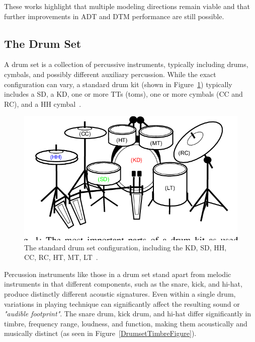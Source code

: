 These works highlight that multiple modeling directions remain viable and that further improvements in \gls{ADT} and \gls{DTM} performance are still possible.

\subsection{The Drum Set}

A drum set is a collection of percussive instruments, typically including drums, cymbals, and possibly different auxiliary percussion. While the exact configuration can vary, a standard drum kit (shown in Figure~\ref{DrumsetFigure}) typically includes a \gls{SD}, a \gls{KD}, one or more \glspl{TT} (toms), one or more cymbals (\gls{CC} and \gls{RC}), and a \gls{HH} cymbal~\cite{TheDrumHandbook2003}.

\begin{figure}[H]
    \centering
    \includegraphics[scale=0.7, trim={0 1cm 0 0},clip]{figures/drumset}
    \caption{The standard drum set configuration, including the \acrfull{KD}, \acrfull{SD}, \acrfull{HH}, \acrfull{CC}, \acrfull{RC}, \acrfull{HT}, \acrfull{MT}, \acrfull{LT}~\cite{8350302}.}
    \label{DrumsetFigure}
\end{figure}

Percussion instruments like those in a drum set stand apart from melodic instruments in that different components, such as the snare, kick, and hi-hat, produce distinctly different acoustic signatures. Even within a single drum, variations in playing technique can significantly affect the resulting sound or \textit{"audible footprint"}. The snare drum, kick drum, and hi-hat differ significantly in timbre, frequency range, loudness, and function, making them acoustically and musically distinct (as seen in Figure~\ref{DrumsetTimbreFigure}).

